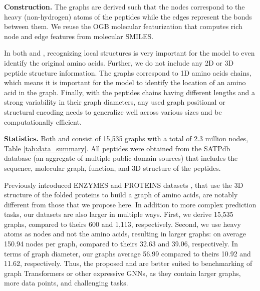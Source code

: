 \documentclass{article}
\begin{document}
\textbf{Construction.}
The graphs are derived such that the nodes correspond to the heavy (non-hydrogen) atoms of the peptides while the edges represent the bonds between them. We reuse the OGB molecular featurization \cite{hu2020open} that computes rich node and edge features from molecular SMILES.

In both \pepfunc and \pepstruct, recognizing local structures is very important for the model to even identify the original amino acids. Further, we do not include any 2D or 3D peptide structure information. The graphs correspond to 1D amino acids chains, which means it is important for the model to identify the location of an amino acid in the graph. Finally, with the peptides chains having different lengths and a strong variability in their graph diameters, any used graph positional or structural encoding needs to generalize well across various sizes and be computationally efficient.


\textbf{Statistics.} Both \pepfunc and \pepstruct consist of 15,535 graphs with a total of 2.3 million nodes, 
Table \ref{tab:data_summary}. All peptides were obtained from the SATPdb \cite{singh2016satpdb} database (an aggregate of multiple public-domain sources) that includes the sequence, molecular graph, function, and 3D structure of the peptides.

Previously introduced ENZYMES and PROTEINS datasets \cite{borgwardt2005protein}, that use the 3D structure of the folded proteins to build a graph of amino acids, are notably different from those that we propose here. In addition to more complex prediction tasks, our datasets are also larger in multiple ways. First, we derive 15,535 graphs, compared to theirs 600 and 1,113, respectively.
Second, we use heavy atoms as nodes and not the amino acids, resulting in larger graphs: on average 150.94 nodes per graph, compared to theirs 32.63 and 39.06, respectively. In terms of graph diameter, our graphs average 56.99 compared to theirs 10.92 and 11.62, respectively. Thus, the proposed \pepfunc and \pepstruct are better suited to benchmarking of graph Transformers or other expressive GNNs, as they contain larger graphs, more data points, and challenging tasks.






\subsubsection{\pepfunc}
\end{document}
